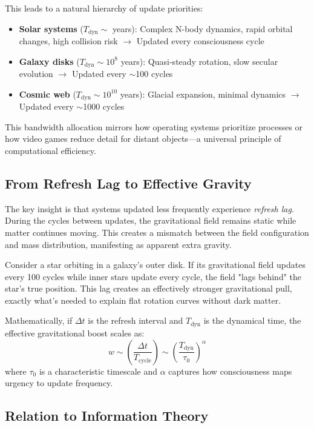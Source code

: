\documentclass[twocolumn,prd,amsmath,amssymb,aps,superscriptaddress,nofootinbib]{revtex4-2}
\begin{document}
This leads to a natural hierarchy of update priorities:

\begin{itemize}
\item \textbf{Solar systems} ($T_{\text{dyn}} \sim$ years): Complex N-body dynamics, rapid orbital changes, high collision risk $\rightarrow$ Updated every consciousness cycle
\item \textbf{Galaxy disks} ($T_{\text{dyn}} \sim 10^8$ years): Quasi-steady rotation, slow secular evolution $\rightarrow$ Updated every $\sim$100 cycles
\item \textbf{Cosmic web} ($T_{\text{dyn}} \sim 10^{10}$ years): Glacial expansion, minimal dynamics $\rightarrow$ Updated every $\sim$1000 cycles
\end{itemize}

This bandwidth allocation mirrors how operating systems prioritize processes or how video games reduce detail for distant objects---a universal principle of computational efficiency.

\subsection{From Refresh Lag to Effective Gravity}

The key insight is that systems updated less frequently experience \emph{refresh lag}. During the cycles between updates, the gravitational field remains static while matter continues moving. This creates a mismatch between the field configuration and mass distribution, manifesting as apparent extra gravity.

Consider a star orbiting in a galaxy's outer disk. If its gravitational field updates every 100 cycles while inner stars update every cycle, the field "lags behind" the star's true position. This lag creates an effectively stronger gravitational pull, exactly what's needed to explain flat rotation curves without dark matter.

Mathematically, if $\Delta t$ is the refresh interval and $T_{\text{dyn}}$ is the dynamical time, the effective gravitational boost scales as:
\begin{equation}
w \sim \left(\frac{\Delta t}{T_{\text{cycle}}}\right) \sim \left(\frac{T_{\text{dyn}}}{\tau_0}\right)^\alpha
\label{eq:boost_scaling}
\end{equation}
where $\tau_0$ is a characteristic timescale and $\alpha$ captures how consciousness maps urgency to update frequency.

\subsection{Relation to Information Theory}
\end{document}
